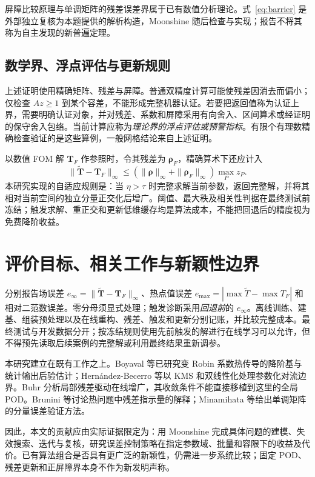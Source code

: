 屏障比较原理与单调矩阵的残差误差界属于已有数值分析理论\cite{minamihata2013}。式~\eqref{eq:barrier} 是外部独立复核为本题提供的解析构造，Moonshine 随后检查与实现；报告不将其称为自主发现的新普遍定理。

\subsection{数学界、浮点评估与更新规则}
上述证明使用精确矩阵、残差与屏障。普通双精度计算可能使残差因消去而偏小；仅检查 $Az\ge1$ 到某个容差，不能形成完整机器认证。若要把返回值称为认证上界，需要明确认证对象，并对残差、系数和屏障采用有向舍入、区间算术或经证明的保守舍入包络。当前计算应称为\emph{理论界的浮点评估或预警指标}。有限个有理数精确检查验证的是这些算例，一般网格结论来自上述证明。

以数值 FOM 解 $\boldsymbol T_F$ 作参照时，令其残差为 $\boldsymbol\rho_F$，精确算术下还应计入
\[
 \|\widetilde{\boldsymbol T}-\boldsymbol T_F\|_\infty
 \le(\|\boldsymbol\rho\|_\infty+\|\boldsymbol\rho_F\|_\infty)
       \max_Pz_P.
\]
本研究实现的自适应规则是：当 $\eta>\tau$ 时完整求解当前参数，返回完整解，并将其相对当前空间的独立分量正交化后增广。阈值、最大秩及相关性判据在最终测试前冻结；触发求解、重正交和更新低维缓存均是算法成本，不能把回退后的精度视为免费降阶收益。

\section{评价目标、相关工作与新颖性边界}
分别报告场误差 $e_\infty=\|\widetilde{\boldsymbol T}-\boldsymbol T_F\|_\infty$、热点值误差 $e_{\max}=|\max\widetilde T-\max T_F|$ 和相对二范数误差。零分母须显式处理；触发诊断采用\emph{回退前}的 $e_\infty$。离线训练、建基、组装预处理以及在线重构、残差、触发和更新分别记账，并比较完整成本。最终测试与开发数据分开；按冻结规则使用先前触发的解进行在线学习可以允许，但不得预先读取后续案例的完整解或利用最终结果重新调参。

本研究建立在既有工作之上。Boyaval 等已研究变 Robin 系数热传导的降阶基与统计输出后验估计\cite{boyaval2009}；Hernández-Becerro 等以 KMS 和双线性化处理参数化对流边界\cite{hernandez2021}。Buhr 分析局部残差驱动在线增广\cite{buhr2018}，其收敛条件不能直接移植到这里的全局 POD。Brunini 等讨论热问题中残差指示量的解释\cite{brunini2022}；Minamihata 等给出单调矩阵的分量误差验证方法\cite{minamihata2013}。

因此，本文的贡献应由实际证据限定为：用 Moonshine 完成具体问题的建模、失效搜索、迭代与复核，研究误差控制策略在指定参数域、批量和容限下的收益及代价。已有算法组合是否具有更广泛的新颖性，仍需进一步系统比较；固定 POD、残差更新和正屏障界本身不作为新发明声称。
